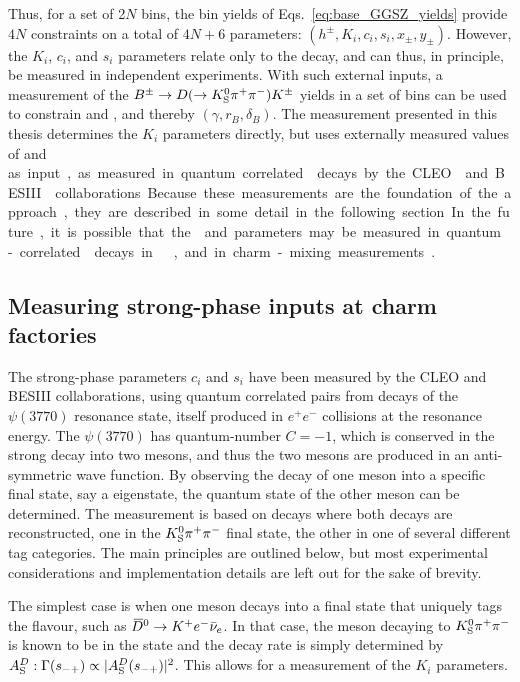 
Thus, for a set of 2$N$ bins, the bin yields of Eqs.~\eqref{eq:base_GGSZ_yields} provide $4N$ constraints on a total of $4N+6$  parameters: $(h^\pm, K_i, c_i, s_i, x_\pm, y_\pm)$. However, the $K_i$, $c_i$, and $s_i$ parameters relate only to the \D decay, and can thus, in principle, be measured in independent experiments. With such external inputs, a measurement of the ${{B}^\pm}\rightarrow D(\rightarrow{\ensuremath{{K}^0_{\mathrm{S}}}}{\ensuremath{{\pi}^+}}{\ensuremath{{\pi}^-}}){{K}^\pm}$ yields in a set of bins can be used to constrain \xpm and \ypm, and thereby $(\gamma, r_B, \delta_B)$. The measurement presented in this thesis determines the $K_i$ parameters directly, but uses externally measured values of \ci and \si as input, as measured in quantum correlated \D decays by the CLEO~\cite{CLEOCISI} and BESIII~\cite{BESCISI} collaborations. Because these measurements are the foundation of the approach, they are described in some detail in the following section. In the future, it is possible that the \ci and \si parameters may be measured in quantum-correlated \D decays in \lhcb~\cite{aaijNearthresholdDDMathrmD2019}, and in charm-mixing measurements~\cite{thomasModelindependentOverlineDMixing2012}.

\subsection{Measuring strong-phase inputs at charm factories} %
\label{sub:measuring_strong_phase_inputs_at_charm_factories}

The strong-phase parameters $c_i$ and $s_i$ have been measured by the CLEO and BESIII collaborations, using quantum correlated \Dz\Dzb pairs from decays of the $\psi(3770)$ resonance state, itself produced in $e^+e^-$ collisions at the resonance energy. The $\psi(3770)$ has quantum-number $C=-1$, which is conserved in the strong decay into two \D mesons, and thus the two \D mesons are produced in an anti-symmetric wave function. By observing the decay of one \D meson into a specific final state, say a \CP eigenstate, the quantum state of the other \D meson can be determined. The measurement is based on decays where both \D decays are reconstructed, one in the ${{K}^0_{\mathrm{S}}}{{\pi}^+}{{\pi}^-}$ final state, the other in one of several different tag categories. The main principles are outlined below, but most experimental considerations and implementation details are left out for the sake of brevity.

The simplest case is when one \D meson decays into a final state that uniquely tags the flavour, such as ${{\kern 0.18em\overline{\kern -0.18em D}}{}^0}\rightarrow{\ensuremath{{K}^+}} e^-\bar\nu_e$. In that case, the \D meson decaying to ${{K}^0_{\mathrm{S}}}{{\pi}^+}{{\pi}^-}$ is known to be in the \Dz state and the decay rate is simply determined by $A_{\rm S}^{D}: \Gamma(s_{-+})\propto |A_{\rm S}^{D}(s_{-+})|^2$. This allows for a measurement of the $K_i$ parameters.

